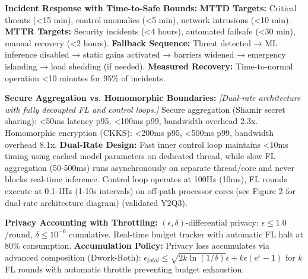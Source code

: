 \documentclass[12pt]{article}
\begin{document}
\textbf{Incident Response with Time-to-Safe Bounds:} \textbf{MTTD Targets:} Critical threats (<15 min), control anomalies (<5 min), network intrusions (<10 min). \textbf{MTTR Targets:} Security incidents (<4 hours), automated failsafe (<30 min), manual recovery (<2 hours). \textbf{Fallback Sequence:} Threat detected → ML inference disabled → static gains activated → barriers widened → emergency islanding → load shedding (if needed). \textbf{Measured Recovery:} Time-to-normal operation <10 minutes for 95\% of incidents.

\textbf{Secure Aggregation vs. Homomorphic Boundaries:} \textit{[Dual-rate architecture with fully decoupled FL and control loops.]} Secure aggregation (Shamir secret sharing): <50ms latency p95, <100ms p99, bandwidth overhead 2.3x. Homomorphic encryption (CKKS): <200ms p95, <500ms p99, bandwidth overhead 8.1x. \textbf{Dual-Rate Design:} Fast inner control loop maintains <10ms timing using cached model parameters on dedicated thread, while slow FL aggregation (50-500ms) runs asynchronously on separate thread/core and never blocks real-time inference. Control loop operates at 100Hz (10ms), FL rounds execute at 0.1-1Hz (1-10s intervals) on off-path processor cores (see Figure 2 for dual-rate architecture diagram) (validated Y2Q3).

\textbf{Privacy Accounting with Throttling:} $(\epsilon, \delta)$-differential privacy: $\epsilon \leq 1.0$/round, $\delta \leq 10^{-6}$ cumulative. Real-time budget tracker with automatic FL halt at 80\% consumption. \textbf{Accumulation Policy:} Privacy loss accumulates via advanced composition (Dwork-Roth): $\epsilon_{total} \leq \sqrt{2k\ln(1/\delta)}\epsilon + k\epsilon(e^\epsilon - 1)$ for $k$ FL rounds with automatic throttle preventing budget exhaustion.
\end{document}
